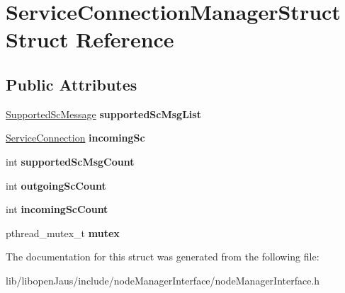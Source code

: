 \hypertarget{struct_service_connection_manager_struct}{\section{\-Service\-Connection\-Manager\-Struct \-Struct \-Reference}
\label{struct_service_connection_manager_struct}
}
\subsection*{\-Public \-Attributes}
\begin{DoxyCompactItemize}
\item 
\hypertarget{struct_service_connection_manager_struct_ae32122054a0d281671f9cf312586f18a}{\hyperlink{struct_supported_sc_message_struct}{\-Supported\-Sc\-Message} {\bfseries supported\-Sc\-Msg\-List}}\label{struct_service_connection_manager_struct_ae32122054a0d281671f9cf312586f18a}

\item 
\hypertarget{struct_service_connection_manager_struct_a9ed4a6f9dae10cccf153706ddaa18618}{\hyperlink{struct_service_connection_struct}{\-Service\-Connection} {\bfseries incoming\-Sc}}\label{struct_service_connection_manager_struct_a9ed4a6f9dae10cccf153706ddaa18618}

\item 
\hypertarget{struct_service_connection_manager_struct_ac0f09676bfc2ea2760e5260c6eb39155}{int {\bfseries supported\-Sc\-Msg\-Count}}\label{struct_service_connection_manager_struct_ac0f09676bfc2ea2760e5260c6eb39155}

\item 
\hypertarget{struct_service_connection_manager_struct_ae91c5ed51c19470a0f4c2499265130b5}{int {\bfseries outgoing\-Sc\-Count}}\label{struct_service_connection_manager_struct_ae91c5ed51c19470a0f4c2499265130b5}

\item 
\hypertarget{struct_service_connection_manager_struct_ab536dbdf30cdad501d5d03c65e43efd7}{int {\bfseries incoming\-Sc\-Count}}\label{struct_service_connection_manager_struct_ab536dbdf30cdad501d5d03c65e43efd7}

\item 
\hypertarget{struct_service_connection_manager_struct_a049b09f1ce988f2db0624422ec00ab02}{pthread\-\_\-mutex\-\_\-t {\bfseries mutex}}\label{struct_service_connection_manager_struct_a049b09f1ce988f2db0624422ec00ab02}

\end{DoxyCompactItemize}


\-The documentation for this struct was generated from the following file\-:\begin{DoxyCompactItemize}
\item 
lib/libopen\-Jaus/include/node\-Manager\-Interface/node\-Manager\-Interface.\-h\end{DoxyCompactItemize}

